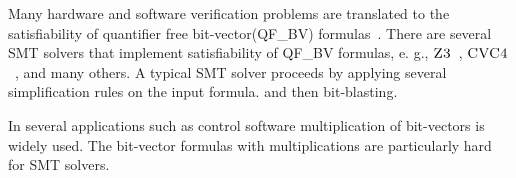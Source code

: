 Many hardware and software verification problems are translated to the satisfiability
of quantifier free bit-vector(QF\_BV) formulas~\cite{hardware,cbmc,more}.
%
There are several SMT solvers that implement satisfiability of 
QF\_BV formulas, e. g., $\textsc{Z3}$~\cite{z3}, $\textsc{CVC4}$~\cite{cvc4}, 
and many others.
%
A typical SMT solver proceeds by applying several
simplification rules on the input formula.
%
and then bit-blasting.

In several applications such as control software multiplication
of bit-vectors is widely used.
%
The bit-vector formulas with multiplications
are particularly hard for SMT solvers.














